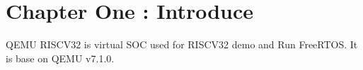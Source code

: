 \newpage
\section{Chapter One : Introduce}
QEMU RISCV32 is virtual SOC used for RISCV32 demo and Run FreeRTOS. It is base on QEMU v7.1.0.
